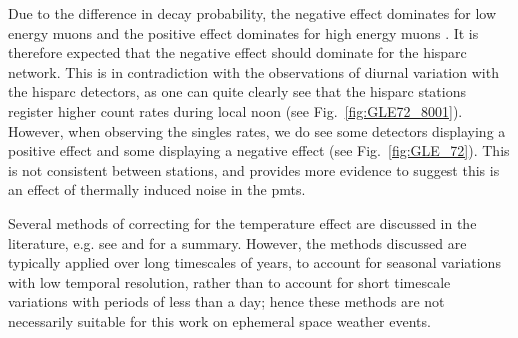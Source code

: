 Due to the difference in decay probability, the negative effect dominates for low energy muons and the positive effect dominates for high energy muons \citep{berkova_temperature_2011}. It is therefore expected that the negative effect should dominate for the \gls{hisparc} network. This is in contradiction with the observations of diurnal variation with the \gls{hisparc} detectors, as one can quite clearly see that the \gls{hisparc} stations register higher count rates during local noon (see Fig.~\ref{fig:GLE72_8001}). However, when observing the singles rates, we do see some detectors displaying a positive effect and some displaying a negative effect (see Fig.~\ref{fig:GLE_72}). This is not consistent between stations, and provides more evidence to suggest this is an effect of thermally induced noise in the \glspl{pmt}. %


Several methods of correcting for the temperature effect are discussed in the literature, e.g. see \citet{berkova_temperature_2011} and \citet{mendoncca_temperature_2016} for a summary. However, the methods discussed are typically applied over long timescales of years, to account for seasonal variations with low temporal resolution, rather than to account for short timescale variations with periods of less than a day; hence these methods are not necessarily suitable for this work on ephemeral space weather events.


